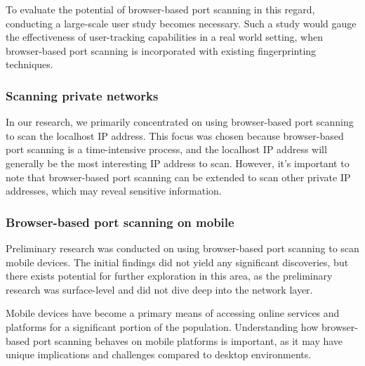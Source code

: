 To evaluate the potential of browser-based port scanning in this regard, conducting a large-scale user study becomes necessary. Such a study would gauge the effectiveness of user-tracking capabilities in a real world setting, when browser-based port scanning is incorporated with existing fingerprinting techniques.

\subsubsection{Scanning private networks}

In our research, we primarily concentrated on using browser-based port scanning to scan the localhost IP address. This focus was chosen because browser-based port scanning is a time-intensive process, and the localhost IP address will generally be the most interesting IP address to scan. However, it's important to note that browser-based port scanning can be extended to scan other private IP addresses, which may reveal sensitive information.

\subsubsection{Browser-based port scanning on mobile}

Preliminary research was conducted on using browser-based port scanning to scan mobile devices. The initial findings did not yield any significant discoveries, but there exists potential for further exploration in this area, as the preliminary research was surface-level and did not dive deep into the network layer.

Mobile devices have become a primary means of accessing online services and platforms for a significant portion of the population. Understanding how browser-based port scanning behaves on mobile platforms is important, as it may have unique implications and challenges compared to desktop environments.




